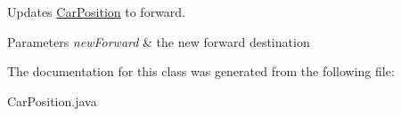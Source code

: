 Updates \hyperlink{class_car_position}{Car\+Position} to forward. 


\begin{DoxyParams}{Parameters}
{\em new\+Forward} & the new forward destination \\
\hline
\end{DoxyParams}


The documentation for this class was generated from the following file\+:\begin{DoxyCompactItemize}
\item 
Car\+Position.\+java\end{DoxyCompactItemize}

